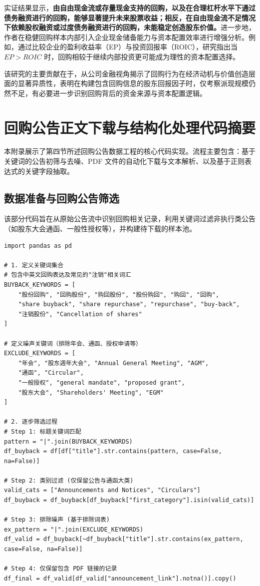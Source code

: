 \documentclass[a4paper,10pt]{article}
\begin{document}
实证结果显示，\textbf{由自由现金流或存量现金支持的回购，以及在合理杠杆水平下通过债务融资进行的回购，能够显著提升未来股票收益；相反，在自由现金流不足情况下依赖股权融资或过度债务融资进行的回购，未能稳定创造股东价值。}进一步地，作者在稳健回购样本内部引入企业现金储备能力与资本配置效率进行增强分析。例如，通过比较企业的盈利收益率（EP）与投资回报率（ROIC），研究指出当 $EP > ROIC$ 时，回购相较于继续内部投资更可能成为理性的资本配置选择。

该研究的主要贡献在于，从公司金融视角揭示了回购行为在经济动机与价值创造层面的显著异质性，表明在构建包含回购信息的股东回报因子时，仅考察派现规模仍然不足，有必要进一步识别回购背后的资金来源与资本配置逻辑。


\section{回购公告正文下载与结构化处理代码摘要}
\label{sec:appendix:code_buyback} %

本附录展示了第四节所述回购公告数据工程的核心代码实现。流程主要包含：基于关键词的公告初筛与去噪、PDF 文件的自动化下载与文本解析、以及基于正则表达式的关键字段抽取。

\subsection{数据准备与回购公告筛选}

该部分代码旨在从原始公告流中识别回购相关记录，利用关键词过滤非执行类公告（如股东大会通函、一般性授权等），并构建待下载的样本池。

\begin{lstlisting}[caption={回购公告筛选与去噪逻辑}, label={code:filter}]
import pandas as pd

# 1. 定义关键词集合
# 包含中英文回购表达及常见的"注销"相关词汇
BUYBACK_KEYWORDS = [
    "股份回购", "回购股份", "购回股份", "股份购回", "购回", "回购",
    "share buyback", "share repurchase", "repurchase", "buy-back",
    "注销股份", "Cancellation of shares"
]

# 定义噪声关键词（排除年会、通函、授权申请等）
EXCLUDE_KEYWORDS = [
    "年会", "股东週年大会", "Annual General Meeting", "AGM",
    "通函", "Circular",
    "一般授权", "general mandate", "proposed grant",
    "股东大会", "Shareholders' Meeting", "EGM"
]

# 2. 逐步筛选过程
# Step 1: 标题关键词匹配
pattern = "|".join(BUYBACK_KEYWORDS)
df_buyback = df[df["title"].str.contains(pattern, case=False, na=False)]

# Step 2: 类别过滤 (仅保留公告与通函大类)
valid_cats = ["Announcements and Notices", "Circulars"]
df_buyback = df_buyback[df_buyback["first_category"].isin(valid_cats)]

# Step 3: 排除噪声 (基于排除词表)
ex_pattern = "|".join(EXCLUDE_KEYWORDS)
df_valid = df_buyback[~df_buyback["title"].str.contains(ex_pattern, case=False, na=False)]

# Step 4: 仅保留包含 PDF 链接的记录
df_final = df_valid[df_valid["announcement_link"].notna()].copy()
\end{lstlisting}
\end{document}
